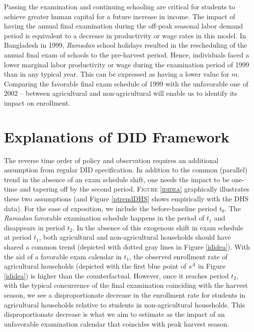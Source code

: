 \documentclass[12pt,letterpaper]{article}
\newcommand{\0}{\ensuremath{\mbox{\boldmath $0$}}}
\begin{document}
Passing the examination and continuing schooling are critical for students to achieve greater human capital for a future increase in income. The impact of having the annual final examination during the off-peak seasonal labor demand period is equivalent to a decrease in productivity or wage rates in this model. In Bangladesh in 1999, \textit{Ramadan} school holidays resulted in the rescheduling of the annual final exam of schools to the pre-harvest period. Hence, individuals faced a lower marginal labor productivity or wage during the examination period of 1999 than in any typical year. This can be expressed as having a lower value for $m$. Comparing the favorable final exam schedule of 1999 with the unfavorable one of 2002 -- between agricultural and non-agricultural will enable us to identify its impact on enrollment.


\pagebreak

\section{Explanations of DID Framework}\label{app_a2}

The reverse time order of policy and observation requires an additional assumption from regular DID specification. In addition to the common (parallel) trend in the absence of an exam schedule shift, one needs the impact to be one-time and tapering off by the second period. \textsc{\small Figure \ref{ididea}} graphically illustrates these two assumptions (and Figure \ref{ptrendDHS} shows empirically with the DHS data). For the ease of exposition, we include the before-baseline period $t_{0}$. The \textit{Ramadan} favorable examination schedule happens in the period of $t_{1}$ and disappears in period $t_{2}$. In the absence of this exogenous shift in exam schedule at period $t_{1}$, both agricultural and non-agricultural households should have shared a common trend (depicted with dotted gray lines in Figure \ref{ididea}). With the aid of a favorable exam calendar in $t_{1}$, the observed enrollment rate of agricultural households (depicted with the first blue point of $s^{A}$ in Figure \ref{ididea}) is higher than the counterfactual. However, once it reaches period $t_{2}$, with the typical concurrence of the final examination coinciding with the harvest season, we see a disproportionate decrease in the enrollment rate for students in agricultural households relative to students in non-agricultural households. This disproportionate decrease is what we aim to estimate as the impact of an unfavorable examination calendar that coincides with peak harvest season.
\end{document}
